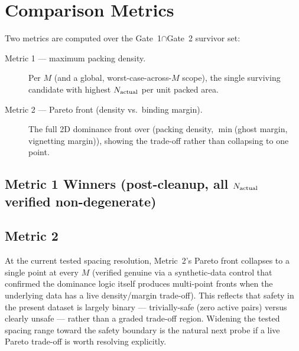 \documentclass[11pt]{article}
\begin{document}
\section{Comparison Metrics}
Two metrics are computed over the Gate~1$\cap$Gate~2 survivor set:

\begin{description}
  \item[Metric 1 --- maximum packing density.] Per $M$ (and a global,
  worst-case-across-$M$ scope), the single surviving candidate with highest
  $N_{\rm actual}$ per unit packed area.
  \item[Metric 2 --- Pareto front (density vs.\ binding margin).] The full
  2D dominance front over (packing density, $\min$(ghost margin, vignetting
  margin)), showing the trade-off rather than collapsing to one point.
\end{description}

\subsection{Metric 1 Winners (post-cleanup, all $N_{\rm actual}$ verified
non-degenerate)}


\subsection{Metric 2}
At the current tested spacing resolution, Metric~2's Pareto front collapses to
a single point at every $M$ (verified genuine via a synthetic-data control
that confirmed the dominance logic itself produces multi-point fronts when the
underlying data has a live density/margin trade-off). This reflects that
safety in the present dataset is largely binary --- trivially-safe (zero
active pairs) versus clearly unsafe --- rather than a graded trade-off region.
Widening the tested spacing range toward the safety boundary is the natural
next probe if a live Pareto trade-off is worth resolving explicitly.
\end{document}
